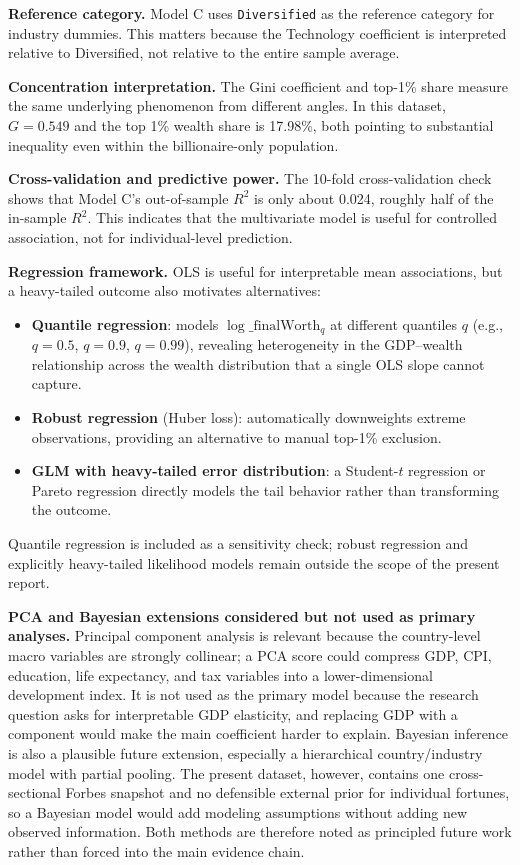 \documentclass[a4paper,10pt]{article}
\begin{document}
\medskip

\textbf{Reference category.} Model C uses \texttt{Diversified} as the reference category for industry dummies. This matters because the Technology coefficient is interpreted relative to Diversified, not relative to the entire sample average.

\medskip

\textbf{Concentration interpretation.} The Gini coefficient and top-1\% share measure the same underlying phenomenon from different angles. In this dataset, $G=0.549$ and the top 1\% wealth share is 17.98\%, both pointing to substantial inequality even within the billionaire-only population.

\medskip

\textbf{Cross-validation and predictive power.} The 10-fold cross-validation check shows that Model C's out-of-sample $R^2$ is only about 0.024, roughly half of the in-sample $R^2$. This indicates that the multivariate model is useful for controlled association, not for individual-level prediction.

\medskip

\textbf{Regression framework.} OLS is useful for interpretable mean associations, but a heavy-tailed outcome also motivates alternatives:
\begin{itemize}
  \item \textbf{Quantile regression}: models $\log\_\textrm{finalWorth}_{q}$ at different quantiles $q$ (e.g., $q=0.5$, $q=0.9$, $q=0.99$), revealing heterogeneity in the GDP--wealth relationship across the wealth distribution that a single OLS slope cannot capture.
  \item \textbf{Robust regression} (Huber loss): automatically downweights extreme observations, providing an alternative to manual top-1\% exclusion.
  \item \textbf{GLM with heavy-tailed error distribution}: a Student-$t$ regression or Pareto regression directly models the tail behavior rather than transforming the outcome.
\end{itemize}
Quantile regression is included as a sensitivity check; robust regression and explicitly heavy-tailed likelihood models remain outside the scope of the present report.

\medskip

\textbf{PCA and Bayesian extensions considered but not used as primary analyses.} Principal component analysis is relevant because the country-level macro variables are strongly collinear; a PCA score could compress GDP, CPI, education, life expectancy, and tax variables into a lower-dimensional development index. It is not used as the primary model because the research question asks for interpretable GDP elasticity, and replacing GDP with a component would make the main coefficient harder to explain. Bayesian inference is also a plausible future extension, especially a hierarchical country/industry model with partial pooling. The present dataset, however, contains one cross-sectional Forbes snapshot and no defensible external prior for individual fortunes, so a Bayesian model would add modeling assumptions without adding new observed information. Both methods are therefore noted as principled future work rather than forced into the main evidence chain.
\end{document}
